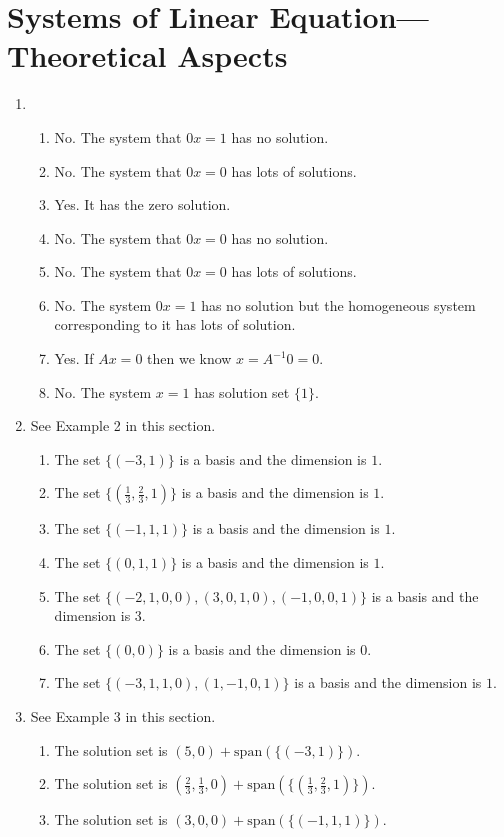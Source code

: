 \section{Systems of Linear Equation---Theoretical Aspects}
\begin{enumerate}
\item \begin{enumerate}
\item No. The system that $0x=1$ has no solution.
\item No. The system that $0x=0$ has lots of solutions.
\item Yes. It has the zero solution.
\item No. The system that $0x=0$ has no solution.
\item No. The system that $0x=0$ has lots of solutions.
\item No. The system $0x=1$ has no solution but the homogeneous system corresponding to it has lots of solution.
\item Yes. If $Ax=0$ then we know $x=A^{-1}0=0$.
\item No. The system $x=1$ has solution set $\{1\}$.
\end{enumerate}
\item See Example 2 in this section.\begin{enumerate}
\item The set $\{(-3,1)\}$ is a basis and the dimension is $1$.
\item The set $\{(\frac{1}{3},\frac{2}{3},1)\}$ is a basis and the dimension is $1$.
\item The set $\{(-1,1,1)\}$ is a basis and the dimension is $1$.
\item The set $\{(0,1,1)\}$ is a basis and the dimension is $1$.
\item The set $\{(-2,1,0,0),(3,0,1,0),(-1,0,0,1)\}$ is a basis and the dimension is $3$.
\item The set $\{(0,0)\}$ is a basis and the dimension is $0$.
\item The set $\{(-3,1,1,0),(1,-1,0,1)\}$ is a basis and the dimension is $1$.
\end{enumerate}
\item See Example 3 in this section.\begin{enumerate}
\item The solution set is $(5,0)+\mathrm{span}(\{(-3,1)\})$.
\item The solution set is $(\frac{2}{3},\frac{1}{3},0)+\mathrm{span}(\{(\frac{1}{3},\frac{2}{3},1)\})$.
\item The solution set is $(3,0,0)+\mathrm{span}(\{(-1,1,1)\})$.

\end{enumerate}
\end{enumerate}
